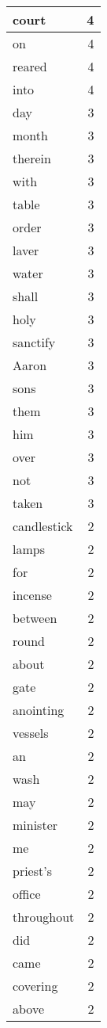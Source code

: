 \begin{center}
\begin{longtable}{l|r}
court & 4 \\ \hline
on & 4 \\ \hline
reared & 4 \\ \hline
into & 4 \\ \hline
day & 3 \\ \hline
month & 3 \\ \hline
therein & 3 \\ \hline
with & 3 \\ \hline
table & 3 \\ \hline
order & 3 \\ \hline
laver & 3 \\ \hline
water & 3 \\ \hline
shall & 3 \\ \hline
holy & 3 \\ \hline
sanctify & 3 \\ \hline
Aaron & 3 \\ \hline
sons & 3 \\ \hline
them & 3 \\ \hline
him & 3 \\ \hline
over & 3 \\ \hline
not & 3 \\ \hline
taken & 3 \\ \hline
candlestick & 2 \\ \hline
lamps & 2 \\ \hline
for & 2 \\ \hline
incense & 2 \\ \hline
between & 2 \\ \hline
round & 2 \\ \hline
about & 2 \\ \hline
gate & 2 \\ \hline
anointing & 2 \\ \hline
vessels & 2 \\ \hline
an & 2 \\ \hline
wash & 2 \\ \hline
may & 2 \\ \hline
minister & 2 \\ \hline
me & 2 \\ \hline
priest's & 2 \\ \hline
office & 2 \\ \hline
throughout & 2 \\ \hline
did & 2 \\ \hline
came & 2 \\ \hline
covering & 2 \\ \hline
above & 2 \\ \hline

\end{longtable}
\end{center}
